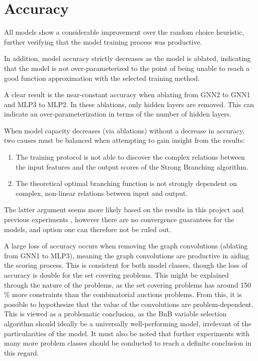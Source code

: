 \section{Accuracy}\label{sec:disc_accuracy}

All models show a considerable improvement over the random choice heuristic, further verifying that the model training process was productive. 

In addition, model accuracy strictly decreases as the model is ablated, indicating that the model is not over-parameterized to the point of being unable to reach a good function approximation with the selected training method. 

A clear result is the near-constant accuracy when ablating from GNN2 to GNN1 and MLP3 to MLP2. In these ablations, only hidden layers are removed. This can indicate an over-parameterization in terms of the number of hidden layers.


When model capacity decreases (via ablations) without a decrease in accuracy, two causes must be balanced when attempting to gain insight from the results: 
\begin{enumerate}[label=(\roman*)]
    \item The training protocol is not able to discover the complex relations between the input features and the output scores of the Strong Branching algorithm.
    \item The theoretical optimal branching function is not strongly dependent on complex, non-linear relations between input and output.
\end{enumerate}
The latter argument seems more likely based on the results in this project and previous experiments \cite{gupta2020hybrid} \cite{gasse2019exact}, however there are no convergence guarantees for the models, and option one can therefore not be ruled out.





A large loss of accuracy occurs when removing the graph convolutions (ablating from GNN1 to MLP3), meaning the graph convolutions are productive in aiding the scoring process. This is consistent for both model classes, though the loss of accuracy is double for the set covering problems. This might be explained through the nature of the problems, as the set covering problems has around 150 \% more constraints than the combinatorial auctions problems. From this, it is possible to hypothesize that the value of the convolutions are problem-dependent. This is viewed as a problematic conclusion, as the \gls{BnB} variable selection algorithm should ideally be a universally well-performing model, irrelevant of the particularities of the model. It must also be noted that further experiments with many more problem classes should be conducted to reach a definite conclusion in this regard. 


